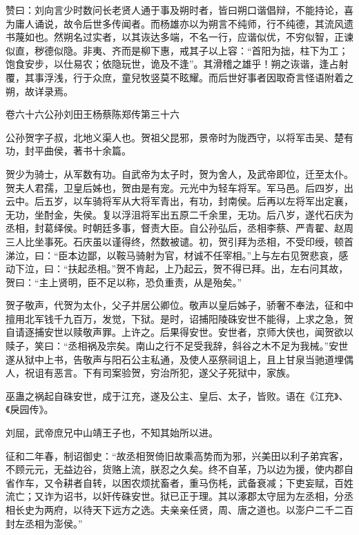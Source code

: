 \documentclass[12pt,UTF8]{ctexbook}
\begin{document}
赞曰：刘向言少时数问长老贤人通于事及朔时者，皆曰朔口谐倡辩，不能持论，喜为庸人诵说，故令后世多传闻者。而杨雄亦以为朔言不纯师，行不纯德，其流风遗书蔑如也。然朔名过实者，以其诙达多端，不名一行，应谐似优，不穷似智，正谏似直，秽德似隐。非夷、齐而是柳下惠，戒其子以上容：“首阳为拙，柱下为工；饱食安步，以仕易农；依隐玩世，诡及不逢”。其滑稽之雄乎！朔之诙谐，逢占射覆，其事浮浅，行于众庶，童兒牧竖莫不眩耀。而后世好事者因取奇言怪语附着之朔，故详录焉。





卷六十六公孙刘田王杨蔡陈郑传第三十六



公孙贺字子叔，北地义渠人也。贺祖父昆邪，景帝时为陇西守，以将军击吴、楚有功，封平曲侯，著书十余篇。



贺少为骑士，从军数有功。自武帝为太子时，贺为舍人，及武帝即位，迁至太仆。贺夫人君孺，卫皇后姊也，贺由是有宠。元光中为轻车将军。军马邑。后四岁，出云中。后五岁，以车骑将军从大将军青出，有功，封南侯。后再以左将军出定襄，无功，坐酎金，失侯。复以浮沮将军出五原二千余里，无功。后八岁，遂代石庆为丞相，封葛绎侯。时朝廷多事，督责大臣。自公孙弘后，丞相李蔡、严青翟、赵周三人比坐事死。石庆虽以谨得终，然数被谴。初，贺引拜为丞相，不受印绶，顿首涕泣，曰：“臣本边鄙，以鞍马骑射为官，材诚不任宰相。”上与左右见贺悲哀，感动下泣，曰：“扶起丞相。”贺不肯起，上乃起云，贺不得已拜。出，左右问其故，贺曰：“主上贤明，臣不足以称，恐负重责，从是殆矣。”



贺子敬声，代贺为太仆，父子并居公卿位。敬声以皇后姊子，骄奢不奉法，征和中擅用北军钱千九百万，发觉，下狱。是时，诏捕阳陵硃安世不能得，上求之急，贺自请逐捕安世以赎敬声罪。上许之。后果得安世。安世者，京师大侠也，闻贺欲以赎子，笑曰：“丞相祸及宗矣。南山之行不足受我辞，斜谷之木不足为我械。”安世遂从狱中上书，告敬声与阳石公主私通，及使人巫祭祠诅上，且上甘泉当驰道埋偶人，祝诅有恶言。下有司案验贺，穷治所犯，遂父子死狱中，家族。



巫蛊之祸起自硃安世，成于江充，遂及公主、皇后、太子，皆败。语在《江充》、《戾园传》。



刘屈，武帝庶兄中山靖王子也，不知其始所以进。



征和二年春，制诏御史：“故丞相贺倚旧故乘高势而为邪，兴美田以利子弟宾客，不顾元元，无益边谷，货赂上流，朕忍之久矣。终不自革，乃以边为援，使内郡自省作车，又令耕者自转，以困农烦扰畜者，重马伤枆，武备衰减；下吏妄赋，百姓流亡；又诈为诏书，以奸传硃安世。狱已正于理。其以涿郡太守屈为左丞相，分丞相长史为两府，以待天下远方之选。夫亲亲任贤，周、唐之道也。以澎户二千二百封左丞相为澎侯。”
\end{document}
